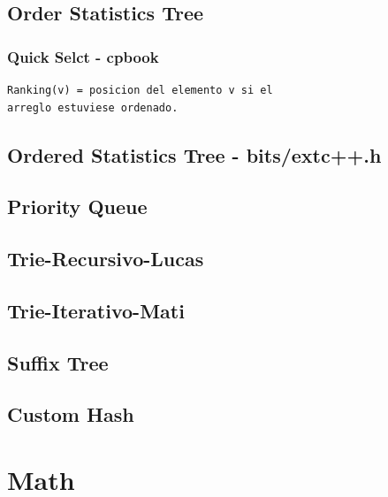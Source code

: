 \subsection{Order Statistics Tree}
\subsubsection{Quick Selct - cpbook}
\begin{verbatim}
Ranking(v) = posicion del elemento v si el 
arreglo estuviese ordenado.
\end{verbatim}
\raggedbottom
\hrulefill
\subsection{Ordered Statistics Tree - bits/extc++.h}
\raggedbottom
\hrulefill
\subsection{Priority Queue}
\raggedbottom
\hrulefill
\subsection{Trie-Recursivo-Lucas}
\raggedbottom
\hrulefill
\subsection{Trie-Iterativo-Mati}
\raggedbottom
\hrulefill
\subsection{Suffix Tree}
\raggedbottom
\hrulefill
\subsection{Custom Hash}
\raggedbottom
\hrulefill
\section{Math}
